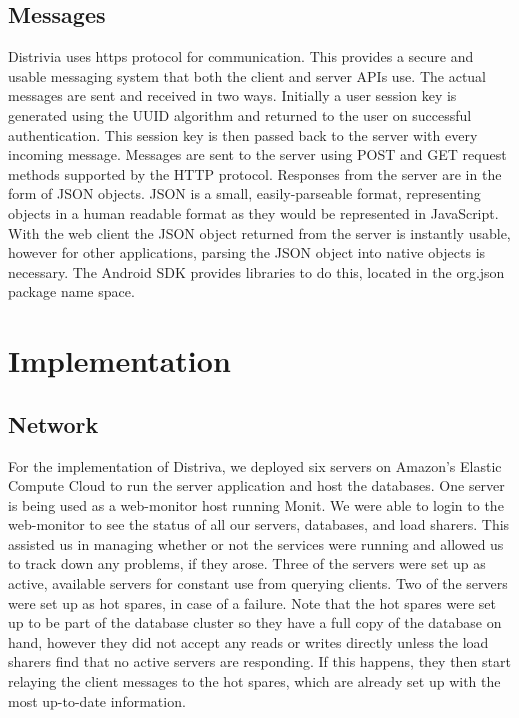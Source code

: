\documentclass{dependencies/acm_proc_article-sp}
\begin{document}
\subsection{Messages}
Distrivia uses https protocol for communication. 
This provides a secure and usable messaging system that both the client and server APIs use.
The actual messages are sent and received in two ways. 
Initially a user session key is generated using the UUID\cite{uuid} algorithm and returned to the user on successful authentication. 
This session key is then passed back to the server with every incoming
message. 
Messages are sent to the server using POST and GET request methods supported
by the HTTP protocol. 
Responses from the server are in the form of JSON \cite{json} objects.
JSON is a small, easily-parseable format, representing objects in a human readable format as they would be represented in JavaScript. 
With the web client the JSON object returned from the server is instantly usable, however for other applications, parsing the JSON object into native objects is necessary. 
The Android SDK provides libraries to do this, located in the
org.json \cite{orgjson} package name space.

\section{Implementation}
\subsection{Network}
For the implementation of Distriva, we deployed six servers on Amazon's Elastic Compute Cloud \cite{aec} to run the server application and host the databases.
One server is being used as a web-monitor host running Monit\cite{monit}.
We were able to login to the web-monitor to see the status of all our servers, databases, and load sharers.
This assisted us in managing whether or not the services were running and allowed us to track down any problems, if they arose.
Three of the servers were set up as active, available servers for constant use from querying clients.
Two of the servers were set up as hot spares, in case of a failure.
Note that the hot spares were set up to be part of the database cluster so they have a full copy of the database on hand, however they did not accept any reads or writes directly unless the load sharers find that no active servers are responding.
If this happens, they then start relaying the client messages to the hot spares, which are already set up with the most up-to-date information. 
\end{document}
